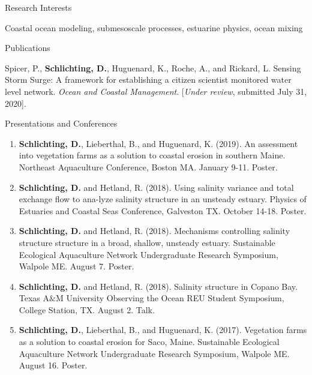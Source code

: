 \documentclass{resume} %
\begin{document}
\begin{rSection}{Research Interests}
\vspace{-10pt}
\item Coastal ocean modeling, submesoscale processes, estuarine physics, ocean mixing

\end{rSection}

\begin{rSection}{Publications}
\vspace{-10pt}
\item Spicer, P., \textbf{Schlichting, D.}, Huguenard, K., Roche, A., and Rickard, L. Sensing Storm Surge: A framework for establishing a citizen scientist monitored water level network. \textit{Ocean and Coastal Management}. [\textit{Under review}, submitted July 31, 2020].
\end{rSection}

\begin{rSection}{Presentations and Conferences} \itemsep -3pt  
\begin{enumerate}
    \item \textbf{Schlichting, D.}, Lieberthal, B., and Huguenard, K. (2019). An assessment into vegetation farms as a solution to coastal erosion in southern Maine. Northeast Aquaculture Conference, Boston MA. January 9-11. Poster.
    \item \textbf{Schlichting, D.} and Hetland, R. (2018). Using salinity variance and total exchange flow to ana-lyze salinity structure in an unsteady estuary. Physics of Estuaries and Coastal Seas Conference, Galveston TX. October 14-18. Poster.
    \item \textbf{Schlichting, D.} and Hetland, R. (2018). Mechanisms controlling salinity structure structure in a broad, shallow, unsteady estuary. Sustainable Ecological Aquaculture Network Undergraduate Research Symposium, Walpole ME. August 7. Poster.
    \item \textbf{Schlichting, D.} and Hetland, R. (2018). Salinity structure in Copano Bay. Texas A$\&$M University Observing the Ocean REU Student Symposium, College Station, TX. August 2. Talk.
    \item \textbf{Schlichting, D.}, Lieberthal, B., and Huguenard, K. (2017). Vegetation farms as a solution to coastal erosion for Saco, Maine. Sustainable Ecological Aquaculture Network Undergraduate Research Symposium, Walpole ME. August 16. Poster.
\end{enumerate}
\end{rSection}
\end{document}
